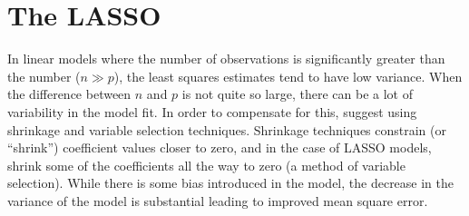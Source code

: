 \section{The LASSO}

In linear models where the number of observations is significantly greater than the number ($n \gg p$), the least squares estimates tend to have low variance. When the difference between $n$ and $p$ is not quite so large, there can be a lot of variability in the model fit. In order to compensate for this, \citet{james2013} suggest using shrinkage and variable selection techniques. Shrinkage techniques constrain (or ``shrink'') coefficient values closer to zero, and in the case of LASSO models, shrink some of the coefficients all the way to zero (a method of variable selection). While there is some bias introduced in the model, the decrease in the variance of the model is substantial leading to improved mean square error.

